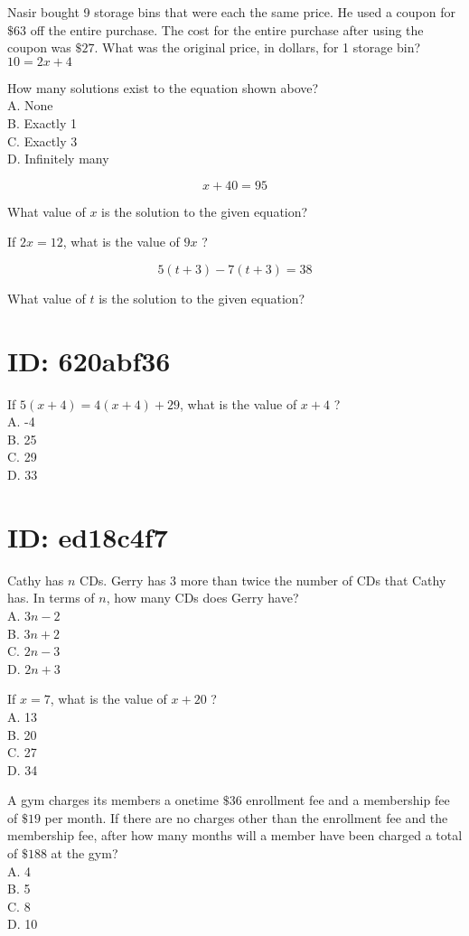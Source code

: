 Nasir bought 9 storage bins that were each the same price. He used a coupon for $\$ 63$ off the entire purchase. The cost for the entire purchase after using the coupon was $\$ 27$. What was the original price, in dollars, for 1 storage bin?\\
$10=2 x+4$

How many solutions exist to the equation shown above?\\
A. None\\
B. Exactly 1\\
C. Exactly 3\\
D. Infinitely many

$$
x+40=95
$$

What value of $x$ is the solution to the given equation?

If $2 x=12$, what is the value of $9 x$ ?

$$
5(t+3)-7(t+3)=38
$$

What value of $t$ is the solution to the given equation?

\section*{ID: 620abf36}
If $5(x+4)=4(x+4)+29$, what is the value of $x+4$ ?\\
A. -4\\
B. 25\\
C. 29\\
D. 33

\section*{ID: ed18c4f7}
Cathy has $n$ CDs. Gerry has 3 more than twice the number of CDs that Cathy has. In terms of $n$, how many CDs does Gerry have?\\
A. $3 n-2$\\
B. $3 n+2$\\
C. $2 n-3$\\
D. $2 n+3$

If $x=7$, what is the value of $x+20$ ?\\
A. 13\\
B. 20\\
C. 27\\
D. 34

A gym charges its members a onetime $\$ 36$ enrollment fee and a membership fee of $\$ 19$ per month. If there are no charges other than the enrollment fee and the membership fee, after how many months will a member have been charged a total of $\$ 188$ at the gym?\\
A. 4\\
B. 5\\
C. 8\\
D. 10

